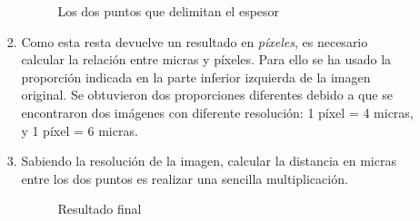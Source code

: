 \begin{enumerate}
\begin{enumerate}[label*=\arabic*.]
\begin{enumerate}[label*=\arabic*.]
      \begin{figure}[H]
        \caption{Los dos puntos que delimitan el espesor}
        \centering \setlength\fboxsep{0pt} \setlength\fboxrule{0.5pt}
      \end{figure}

    \item Como esta resta devuelve un resultado en \emph{píxeles}, es
      necesario calcular la relación entre micras y píxeles. Para ello
      se ha usado la proporción indicada en la parte inferior
      izquierda de la imagen original. Se obtuvieron dos proporciones
      diferentes debido a que se encontraron dos imágenes con
      diferente resolución: 1 píxel = 4 micras, y 1 píxel = 6 micras.
    \item Sabiendo la resolución de la imagen, calcular la distancia
      en micras entre los dos puntos es realizar una sencilla
      multiplicación.

      \begin{figure}[H]
        \caption{Resultado final}
        \centering \setlength\fboxsep{0pt} \setlength\fboxrule{0.5pt}
      \end{figure}

    \end{enumerate}
  \end{enumerate}
\end{enumerate}

